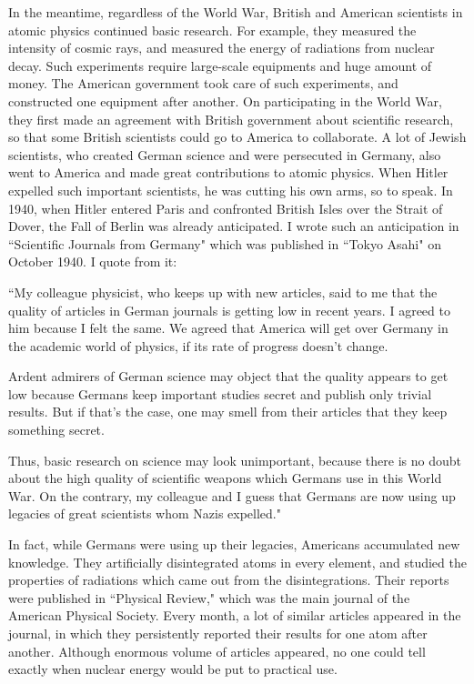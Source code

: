 \documentclass[11pt,a4j,twocolumn]{jarticle}
\begin{document}
In the meantime, regardless of the World War, 
British and American scientists in atomic physics continued basic research.
For example, they measured the intensity of cosmic rays,
and measured the energy of radiations from nuclear decay.
Such experiments require large-scale equipments and huge amount of money.
The American government took care of such experiments, 
and constructed one equipment after another.
On participating in the World War, they first made an agreement with British government
about scientific research, so that some British scientists could go to America to collaborate.
A lot of Jewish scientists, who created German science and were persecuted in Germany,
also went to America and made great contributions to atomic physics.
When Hitler expelled such important scientists, he was cutting his own arms, so to speak.
In 1940, when Hitler entered Paris and confronted British Isles over the Strait of Dover,
the Fall of Berlin was already anticipated.
I wrote such an anticipation in ``Scientific Journals from Germany" which was 
published in ``Tokyo Asahi" on October 1940. I quote from it:

\medskip
``My colleague physicist, who keeps up with new articles, said to me that
the quality of articles in German journals is getting low in recent years.
I agreed to him because I felt the same.
We agreed that America will get over Germany in the academic world of physics,
if its rate of progress doesn't change.

Ardent admirers of German science may object that
the quality appears to get low because Germans keep important studies secret
and publish only trivial results. But if that's the case, one may smell
from their articles that they keep something secret.

Thus, basic research on science may look unimportant,
because there is no doubt about the high quality of
scientific weapons which Germans use in this World War.
On the contrary, my colleague and I guess that Germans are now using up
legacies of great scientists whom Nazis expelled."

\medskip
In fact, while Germans were using up their legacies,
Americans accumulated new knowledge.
They artificially disintegrated atoms in every element,
and studied the properties of radiations which came out from the disintegrations.
Their reports were published in ``Physical Review," which was
the main journal of the American Physical Society.
Every month, a lot of similar articles appeared in the journal,
in which they persistently reported their results for one atom after another.
Although enormous volume of articles appeared,
no one could tell exactly when nuclear energy would be put to practical use.
\end{document}
